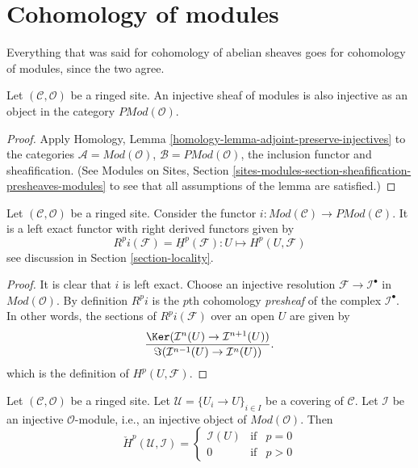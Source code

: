 \section{Cohomology of modules}
\label{section-cohomology-modules}

\noindent
Everything that was said for cohomology of abelian sheaves
goes for cohomology of modules, since the two agree.

\begin{lemma}
\label{lemma-injective-module-injective-presheaf}
Let $(\mathcal{C}, \mathcal{O})$ be a ringed site.
An injective sheaf of modules is also injective as an
object in the category $\textit{PMod}(\mathcal{O})$.
\end{lemma}

\begin{proof}
Apply Homology, Lemma \ref{homology-lemma-adjoint-preserve-injectives}
to the categories $\mathcal{A} = \textit{Mod}(\mathcal{O})$,
$\mathcal{B} = \textit{PMod}(\mathcal{O})$, the inclusion functor
and sheafification. (See
Modules on Sites,
Section \ref{sites-modules-section-sheafification-presheaves-modules}
to see that all assumptions of the lemma are satisfied.)
\end{proof}

\begin{lemma}
\label{lemma-include-modules}
Let $(\mathcal{C}, \mathcal{O})$ be a ringed site.
Consider the functor
$i : \textit{Mod}(\mathcal{C}) \to \textit{PMod}(\mathcal{C})$.
It is a left exact functor with right derived functors given by
$$
R^pi(\mathcal{F}) = \underline{H}^p(\mathcal{F}) :
U \longmapsto H^p(U, \mathcal{F})
$$
see discussion in
Section \ref{section-locality}.
\end{lemma}

\begin{proof}
It is clear that $i$ is left exact.
Choose an injective resolution $\mathcal{F} \to \mathcal{I}^\bullet$
in $\textit{Mod}(\mathcal{O})$.
By definition $R^pi$ is the $p$th cohomology {\it presheaf}
of the complex $\mathcal{I}^\bullet$. In other words, the
sections of $R^pi(\mathcal{F})$ over an open $U$ are given by
$$
\frac{\Ker(\mathcal{I}^n(U) \to \mathcal{I}^{n + 1}(U))}
{\Im(\mathcal{I}^{n - 1}(U) \to \mathcal{I}^n(U))}.
$$
which is the definition of $H^p(U, \mathcal{F})$.
\end{proof}

\begin{lemma}
\label{lemma-injective-module-trivial-cech}
Let $(\mathcal{C}, \mathcal{O})$ be a ringed site.
Let $\mathcal{U} = \{U_i \to U\}_{i \in I}$ be a covering of $\mathcal{C}$.
Let $\mathcal{I}$ be an injective $\mathcal{O}$-module, i.e., an injective
object of $\textit{Mod}(\mathcal{O})$. Then
$$
\check{H}^p(\mathcal{U}, \mathcal{I}) =
\left\{
\begin{matrix}
\mathcal{I}(U) & \text{if} & p = 0 \\
0 & \text{if} & p > 0
\end{matrix}
\right.
$$
\end{lemma}

